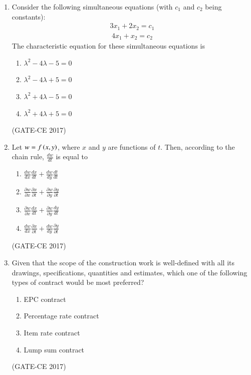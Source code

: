 \documentclass[journal,12pt,onecolumn]{article}
\theoremstyle{remark}
\begin{document}
\begin{enumerate}
    \item Consider the following simultaneous equations (with $c_1$ and $c_2$ being constants):
    \begin{align}
    3x_1 + 2x_2 = c_1
    \end{align}
    \begin{align}
    4x_1 + x_2 = c_2
    \end{align}
    The characteristic equation for these simultaneous equations is
    \begin{multicols}{2}
    \begin{enumerate}
        \item $\lambda^2 - 4\lambda - 5 = 0$  
        \item $\lambda^2 - 4\lambda + 5 = 0$  
        \item $\lambda^2 + 4\lambda - 5 = 0$  
        \item $\lambda^2 + 4\lambda + 5 = 0$  
    \end{enumerate}
    \end{multicols}
    \hfill (GATE-CE 2017)

    \item Let $w = f\left(x, y\right)$, where $x$ and $y$ are functions of  $t$. Then, according to the chain rule, $\frac{dw}{dt}$ is equal to
    \begin{multicols}{2}
    \begin{enumerate}
        \item $\frac{dw}{dx} \frac{dx}{dt} + \frac{dw}{dy} \frac{dt}{dt} $
        \item $\frac{\partial w}{\partial x} \frac{\partial x}{\partial t} + \frac{\partial w}{\partial y} \frac{\partial y}{\partial t}$ 
        \item $\frac{\partial w}{\partial x} \frac{dx}{dt} + \frac{\partial w}{\partial y} \frac{dy}{dt}$ 
        \item $\frac{dw}{dx} \frac{\partial x}{\partial t} + \frac{dw}{dy} \frac{\partial y}{\partial t}$  
    \end{enumerate}
    \end{multicols}
    \hfill (GATE-CE 2017)

    \item Given that the scope of the construction work is well-defined with all its drawings, specifications, quantities and estimates, which one of the following types of contract would be most preferred?
    \begin{multicols}{2}
    \begin{enumerate}
        \item EPC contract  
        \item Percentage rate contract  
        \item Item rate contract  
        \item Lump sum contract  
    \end{enumerate}
    \end{multicols}
    \hfill (GATE-CE 2017)


\end{enumerate}
\end{document}
